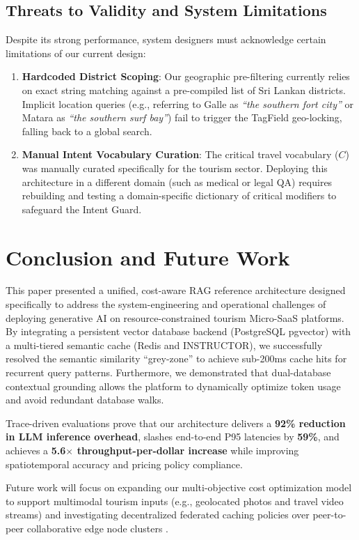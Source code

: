\documentclass{ieeeaccess}
\begin{document}
\subsection{Threats to Validity and System Limitations}
Despite its strong performance, system designers must acknowledge certain limitations of our current design:
\begin{enumerate}
    \item \textbf{Hardcoded District Scoping}: Our geographic pre-filtering currently relies on exact string matching against a pre-compiled list of Sri Lankan districts. Implicit location queries (e.g., referring to Galle as \emph{``the southern fort city''} or Matara as \emph{``the southern surf bay''}) fail to trigger the TagField geo-locking, falling back to a global search.
    \item \textbf{Manual Intent Vocabulary Curation}: The critical travel vocabulary ($C$) was manually curated specifically for the tourism sector. Deploying this architecture in a different domain (such as medical or legal QA) requires rebuilding and testing a domain-specific dictionary of critical modifiers to safeguard the Intent Guard.
\end{enumerate}


\section{Conclusion and Future Work}
This paper presented a unified, cost-aware RAG reference architecture designed specifically to address the system-engineering and operational challenges of deploying generative AI on resource-constrained tourism Micro-SaaS platforms. By integrating a persistent vector database backend (PostgreSQL pgvector) with a multi-tiered semantic cache (Redis and INSTRUCTOR), we successfully resolved the semantic similarity ``grey-zone'' to achieve sub-200ms cache hits for recurrent query patterns. Furthermore, we demonstrated that dual-database contextual grounding allows the platform to dynamically optimize token usage and avoid redundant database walks. 

Trace-driven evaluations prove that our architecture delivers a \textbf{92\% reduction in LLM inference overhead}, slashes end-to-end P95 latencies by \textbf{59\%}, and achieves a \textbf{5.6$\times$ throughput-per-dollar increase} while improving spatiotemporal accuracy and pricing policy compliance. 

Future work will focus on expanding our multi-objective cost optimization model to support multimodal tourism inputs (e.g., geolocated photos and travel video streams) and investigating decentralized federated caching policies over peer-to-peer collaborative edge node clusters \cite{xiong-coedge-rag-2025}.
\end{document}
